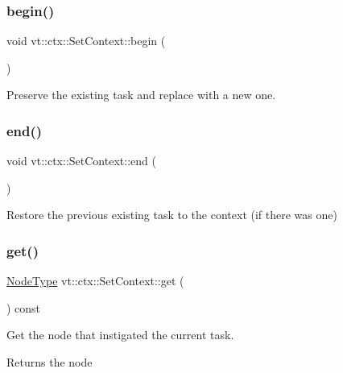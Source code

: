 \subsubsection{\texorpdfstring{begin()}{begin()}}
{\footnotesize\ttfamily void vt\+::ctx\+::\+Set\+Context\+::begin (\begin{DoxyParamCaption}{ }\end{DoxyParamCaption})}



Preserve the existing task and replace with a new one. 

\mbox{\label{structvt_1_1ctx_1_1_set_context_a8c7f47ebcd80b28a115fd0e929d89434}} 
\subsubsection{\texorpdfstring{end()}{end()}}
{\footnotesize\ttfamily void vt\+::ctx\+::\+Set\+Context\+::end (\begin{DoxyParamCaption}{ }\end{DoxyParamCaption})}



Restore the previous existing task to the context (if there was one) 

\mbox{\label{structvt_1_1ctx_1_1_set_context_ab809e42e05e4ee549fbecc6962307d77}} 
\subsubsection{\texorpdfstring{get()}{get()}}
{\footnotesize\ttfamily \hyperlink{namespacevt_a866da9d0efc19c0a1ce79e9e492f47e2}{Node\+Type} vt\+::ctx\+::\+Set\+Context\+::get (\begin{DoxyParamCaption}{ }\end{DoxyParamCaption}) const\hspace{0.3cm}{\ttfamily [inline]}}



Get the node that instigated the current task. 

\begin{DoxyReturn}{Returns}
the node 
\end{DoxyReturn}
\mbox{\label{structvt_1_1ctx_1_1_set_context_ab9cfd26c1453f6ab9ae5d9b3463676e0}} 
